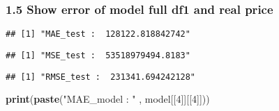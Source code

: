 \documentclass[
]{article}
\newenvironment{Shaded}{\begin{snugshade}}{\end{snugshade}}
\newcommand{\DecValTok}[1]{\textcolor[rgb]{0.00,0.00,0.81}{#1}}
\newcommand{\FunctionTok}[1]{\textcolor[rgb]{0.13,0.29,0.53}{\textbf{#1}}}
\newcommand{\NormalTok}[1]{#1}
\newcommand{\SpecialCharTok}[1]{\textcolor[rgb]{0.81,0.36,0.00}{\textbf{#1}}}
\newcommand{\StringTok}[1]{\textcolor[rgb]{0.31,0.60,0.02}{#1}}
\begin{document}
\hypertarget{show-error-of-model-full-df1-and-real-price}{%
\subsubsection{1.5 Show error of model full df1 and real
price}\label{show-error-of-model-full-df1-and-real-price}}

\begin{Shaded}
\end{Shaded}

\begin{verbatim}
## [1] "MAE_test :  128122.818842742"
\end{verbatim}

\begin{Shaded}
\end{Shaded}

\begin{verbatim}
## [1] "MSE_test :  53518979494.8183"
\end{verbatim}

\begin{Shaded}
\end{Shaded}

\begin{verbatim}
## [1] "RMSE_test :  231341.694242128"
\end{verbatim}

\begin{Shaded}
\begin{Highlighting}[]
\FunctionTok{print}\NormalTok{(}\FunctionTok{paste}\NormalTok{(}\StringTok{"MAE\_model : "}\NormalTok{  ,      model[[}\DecValTok{4}\NormalTok{]][[}\DecValTok{4}\NormalTok{]]))}
\end{Highlighting}
\end{Shaded}
\end{document}
